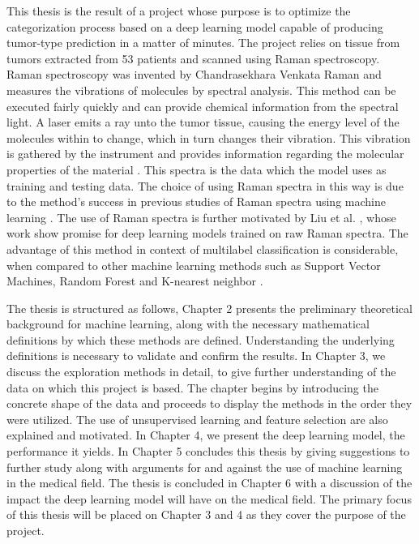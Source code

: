 This thesis is the result of a project whose purpose is to optimize the categorization process based on a deep learning model capable of producing tumor-type prediction in a matter of minutes. The project relies on tissue from tumors extracted from 53 patients and scanned using Raman spectroscopy. Raman spectroscopy was invented by Chandrasekhara Venkata Raman and measures the vibrations of molecules by spectral analysis. This method can be executed fairly quickly and can provide chemical information from the spectral light. A laser emits a ray unto the tumor tissue, causing the energy level of the molecules within to change, which in turn changes their vibration. This vibration is gathered by the instrument and provides information regarding the molecular properties of the material \cite{long1977raman, graves1989practical}. This spectra is the data which the model uses as training and testing data. The choice of using Raman spectra in this way is due to the method's success in previous studies of Raman spectra using machine learning \cite{ramanDL, ho2019rapid}. The use of Raman spectra is further motivated by Liu et al. \cite{liu2017deep}, whose work show promise for deep learning models trained on raw Raman spectra. The advantage of this method in context of multilabel classification is considerable, when compared to other machine learning methods such as Support Vector Machines, Random Forest and K-nearest neighbor \cite{liu2017deep}.

The thesis is structured as follows, Chapter 2 presents the preliminary theoretical background for machine learning, along with the necessary mathematical definitions by which these methods are defined. Understanding the underlying definitions is necessary to validate and confirm the results. In Chapter 3, we discuss the exploration methods in detail, to give further understanding of the data on which this project is based. The chapter begins by introducing the concrete shape of the data and proceeds to display the methods in the order they were utilized. The use of unsupervised learning and feature selection are also explained and motivated. In Chapter 4, we present the deep learning model, the performance it yields. In Chapter 5 concludes this thesis by giving suggestions to further study along with arguments for and against the use of machine learning in the medical field. The thesis is concluded in Chapter 6 with a discussion of the impact the deep learning model will have on the medical field. The primary focus of this thesis will be placed on Chapter 3 and 4 as they cover the purpose of the project.